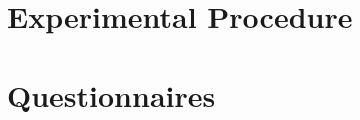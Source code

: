 \begin{appendices}
\begin{lstlisting}
\end{lstlisting}

\chapter{Experimental Procedure}

\chapter{Questionnaires}
\label{ap:questionnaires}



\label{ap:ueq}


\end{appendices}


